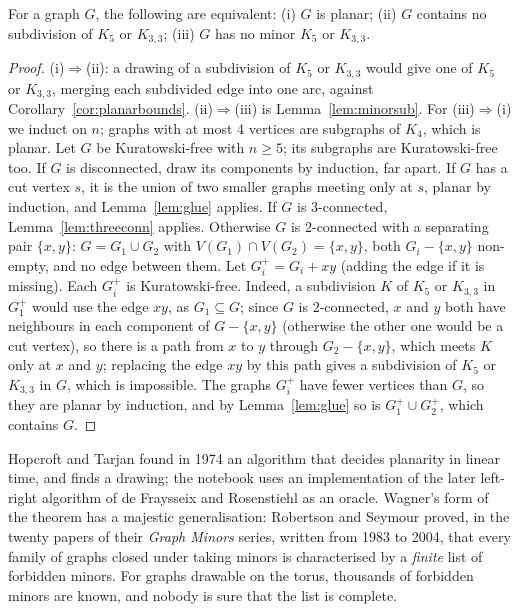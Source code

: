 \begin{theorem}\label{thm:kuratowski}
For a graph $G$, the following are equivalent: (i) $G$ is planar; (ii) $G$ contains no subdivision of $K_5$ or $K_{3,3}$; (iii) $G$ has no minor $K_5$ or $K_{3,3}$.
\end{theorem}
\begin{proof}
(i)$\Rightarrow$(ii): a drawing of a subdivision of $K_5$ or $K_{3,3}$ would give one of $K_5$ or $K_{3,3}$, merging each subdivided edge into one arc, against
Corollary~\ref{cor:planarbounds}. (ii)$\Rightarrow$(iii) is Lemma~\ref{lem:minorsub}. For (iii)$\Rightarrow$(i) we induct on $n$; graphs with at most $4$ vertices are subgraphs of $K_4$, which is planar. Let $G$ be
Kuratowski-free with $n\ge5$; its subgraphs are Kuratowski-free too. If $G$ is disconnected, draw its components by induction, far apart. If $G$ has a cut
vertex $s$, it is the union of two smaller graphs meeting only at $s$, planar by induction, and Lemma~\ref{lem:glue} applies. If $G$ is $3$-connected,
Lemma~\ref{lem:threeconn} applies. Otherwise $G$ is $2$-connected with a separating pair $\{x,y\}$: $G=G_1\cup G_2$ with $V(G_1)\cap V(G_2)=\{x,y\}$, both $G_i-\{x,y\}$ non-empty,
and no edge between them. Let $G_i^+=G_i+xy$ (adding the edge if it is missing). Each $G_i^+$ is Kuratowski-free. Indeed, a subdivision $K$ of $K_5$ or $K_{3,3}$ in $G_1^+$
would use the edge $xy$, as $G_1\subseteq G$; since $G$ is $2$-connected, $x$ and $y$ both have neighbours in each component of $G-\{x,y\}$ (otherwise the other one would be a cut
vertex), so there is a path from $x$ to $y$ through $G_2-\{x,y\}$, which meets $K$ only at $x$ and $y$; replacing the edge $xy$ by this path gives a subdivision of $K_5$ or $K_{3,3}$
in $G$, which is impossible. The graphs $G_i^+$ have fewer vertices than $G$, so they are planar by induction, and by Lemma~\ref{lem:glue} so is $G_1^+\cup G_2^+$, which
contains $G$.
\end{proof}

Hopcroft and Tarjan found in 1974 an algorithm that decides planarity in linear time, and finds a drawing; the notebook uses an
implementation of the later left-right algorithm of de Fraysseix and Rosenstiehl as an oracle. Wagner's form of the theorem has a
majestic generalisation: Robertson and Seymour proved, in the twenty papers of their \emph{Graph Minors} series, written from 1983 to 2004, that every family of graphs
closed under taking minors is characterised by a \emph{finite} list of forbidden minors. For graphs drawable on the torus, thousands of forbidden minors
are known, and nobody is sure that the list is complete.

